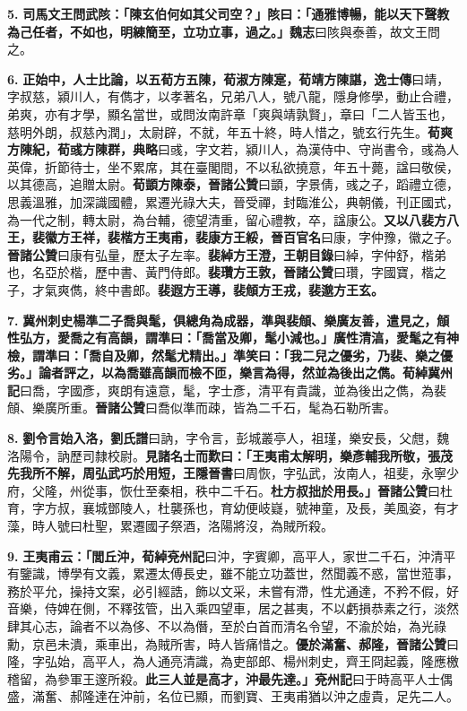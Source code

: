 \textbf{5.} \textbf{司馬文王問武陔：「陳玄伯何如其父司空？」陔曰：「通雅博暢，能以天下聲教為己任者，不如也，明練簡至，立功立事，過之。」}{\footnotesize \textbf{魏志}曰陔與泰善，故文王問之。}

\textbf{6.} \textbf{正始中，人士比論，以五荀方五陳，荀淑方陳寔，荀靖方陳諶，}{\footnotesize \textbf{逸士傳}曰靖，字叔慈，潁川人，有儁才，以孝著名，兄弟八人，號八龍，隱身修學，動止合禮，弟爽，亦有才學，顯名當世，或問汝南許章「爽與靖孰賢」，章曰「二人皆玉也，慈明外朗，叔慈內潤」，太尉辟，不就，年五十終，時人惜之，號玄行先生。}\textbf{荀爽方陳紀，荀彧方陳群，}{\footnotesize \textbf{典略}曰彧，字文若，潁川人，為漢侍中、守尚書令，彧為人英偉，折節待士，坐不累席，其在臺閣間，不以私欲撓意，年五十薨，諡曰敬侯，以其德高，追贈太尉。}\textbf{荀顗方陳泰，}{\footnotesize \textbf{晉諸公贊}曰顗，字景倩，彧之子，蹈禮立德，思義溫雅，加深識國體，累遷光祿大夫，晉受禪，封臨淮公，典朝儀，刊正國式，為一代之制，轉太尉，為台輔，德望清重，留心禮教，卒，諡康公。}\textbf{又以八裴方八王，裴徽方王祥，裴楷方王夷甫，裴康方王綏，}{\footnotesize \textbf{晉百官名}曰康，字仲豫，徽之子。\textbf{晉諸公贊}曰康有弘量，歷太子左率。}\textbf{裴綽方王澄，}{\footnotesize \textbf{王朝目錄}曰綽，字仲舒，楷弟也，名亞於楷，歷中書、黃門侍郎。}\textbf{裴瓚方王敦，}{\footnotesize \textbf{晉諸公贊}曰瓚，字國寶，楷之子，才氣爽儁，終中書郎。}\textbf{裴遐方王導，裴頠方王戎，裴邈方王玄。}

\textbf{7.} \textbf{冀州刺史楊準二子喬與髦，俱總角為成器，準與裴頠、樂廣友善，遣見之，頠性弘方，愛喬之有高韻，謂準曰：「喬當及卿，髦小減也。」廣性清湻，愛髦之有神檢，謂準曰：「喬自及卿，然髦尤精出。」準笑曰：「我二兒之優劣，乃裴、樂之優劣。」論者評之，以為喬雖高韻而檢不匝，樂言為得，然並為後出之儁。}{\footnotesize \textbf{荀綽冀州記}曰喬，字國彥，爽朗有遠意，髦，字士彥，清平有貴識，並為後出之儁，為裴頠、樂廣所重。\textbf{晉諸公贊}曰喬似準而疎，皆為二千石，髦為石勒所害。}

\textbf{8.} \textbf{劉令言始入洛，}{\footnotesize \textbf{劉氏譜}曰訥，字令言，彭城叢亭人，祖瑾，樂安長，父甝，魏洛陽令，訥歷司隸校尉。}\textbf{見諸名士而歎曰：「王夷甫太解明，樂彥輔我所敬，張茂先我所不解，周弘武巧於用短，}{\footnotesize \textbf{王隱晉書}曰周恢，字弘武，汝南人，祖斐，永寧少府，父隆，州從事，恢仕至秦相，秩中二千石。}\textbf{杜方叔拙於用長。」}{\footnotesize \textbf{晉諸公贊}曰杜育，字方叔，襄城鄧陵人，杜襲孫也，育幼便岐嶷，號神童，及長，美風姿，有才藻，時人號曰杜聖，累遷國子祭酒，洛陽將沒，為賊所殺。}

\textbf{9.} \textbf{王夷甫云：「閭丘沖，}{\footnotesize \textbf{荀綽兗州記}曰沖，字賓卿，高平人，家世二千石，沖清平有鑒識，博學有文義，累遷太傅長史，雖不能立功蓋世，然聞義不惑，當世蒞事，務於平允，操持文案，必引經誥，飾以文采，未嘗有滯，性尤通達，不矜不假，好音樂，侍婢在側，不釋弦管，出入乘四望車，居之甚夷，不以虧損恭素之行，淡然肆其心志，論者不以為侈、不以為僭，至於白首而清名令望，不渝於始，為光祿勳，京邑未潰，乘車出，為賊所害，時人皆痛惜之。}\textbf{優於滿奮、郝隆，}{\footnotesize \textbf{晉諸公贊}曰隆，字弘始，高平人，為人通亮清識，為吏部郎、楊州刺史，齊王冏起義，隆應檄稽留，為參軍王邃所殺。}\textbf{此三人並是高才，沖最先達。」}{\footnotesize \textbf{兗州記}曰于時高平人士偶盛，滿奮、郝隆達在沖前，名位已顯，而劉寶、王夷甫猶以沖之虛貴，足先二人。}

